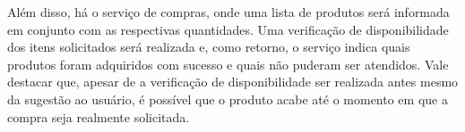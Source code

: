 Além disso, há o serviço de compras, onde uma lista de produtos será informada em conjunto com as respectivas quantidades. Uma verificação de disponibilidade dos itens solicitados será realizada e, como retorno, o serviço indica quais produtos foram adquiridos com sucesso e quais não puderam ser atendidos. Vale destacar que, apesar de a verificação de disponibilidade ser realizada antes mesmo da sugestão ao usuário, é possível que o produto acabe até o momento em que a compra seja realmente solicitada.
